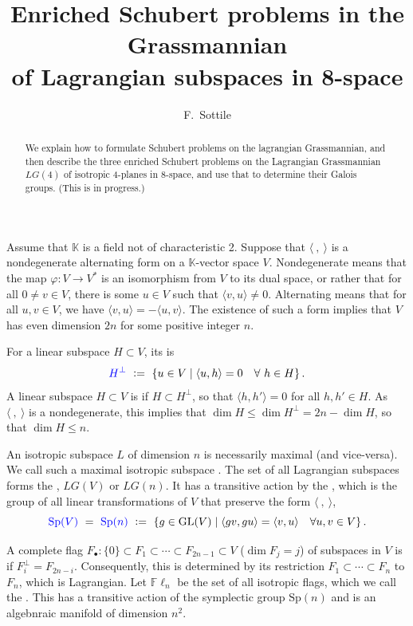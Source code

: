 \documentclass[12pt]{amsart}
\title[Enriched Schubert Problems in $\LG(4)$]{Enriched Schubert problems in the Grassmannian  \\ of Lagrangian subspaces in 8-space}
\author{F.~Sottile}
\theoremstyle{remark}
\newcommand{\GL}{\textrm{GL}}
\newcommand{\Sp}{\textrm{Sp}}
\newcommand{\Fdot}{F_\bullet}
\newcommand{\LG}{\textit{LG}}
\newcommand{\Fln}{{\mathbb F}\ell_n}
\newcommand{\KK}{{\mathbb K}}
\newcommand{\defcolor}[1]{{\color{blue}#1}}
\newcommand{\demph}[1]{\defcolor{{\sl #1}}}
\begin{document}
\begin{abstract}
  We explain how to formulate Schubert problems on the lagrangian Grassmannian, and then
  describe the three enriched Schubert problems on the Lagrangian Grassmannian $\LG(4)$ of isotropic 4-planes in 8-space,
  and use that to determine their Galois groups. (This is in progress.)
\end{abstract}
\maketitle



Assume that $\KK$ is a field not of characteristic 2.
Suppose that $\langle\:,\:\rangle$ is a nondegenerate alternating form on a $\KK$-vector space $V$.
Nondegenerate means that the map $\varphi\colon V\to V^*$ is an isomorphism from $V$ to its dual space,
or rather that for all $0\neq v\in V$, there is some $u\in V$ such that $\langle v, u\rangle\neq 0$.
Alternating means that for all $u,v\in V$, we have $\langle v,u\rangle = - \langle u,v\rangle$.
The existence of such a form implies that $V$ has even dimension $2n$ for some positive integer $n$.

For a linear subspace $H\subset V$, its \demph{annihilator} is
\[
    \defcolor{H^\perp} \ \vcentcolon=\ \{u\in V\mid \langle u, h\rangle =0\quad\forall\ h\in H\}\,.
\]
A linear subspace $H\subset V$ is \demph{isotropic} if $H\subset H^\perp$, so that $\langle h,h'\rangle=0$
for all $h,h'\in H$.
As $\langle\:,\:\rangle$ is a nondegenerate, this implies that $\dim H \leq \dim H^\perp = 2n-\dim H$, so that
$\dim H\leq n$.

An isotropic subspace $L$ of dimension $n$ is necessarily maximal (and vice-versa).
We call such a maximal isotropic subspace \demph{Lagrangian}.
The set of all Lagrangian subspaces forms the \demph{Lagrangian Grassmannian}, \defcolor{$\LG(V)$} or \defcolor{$\LG(n)$}.
It has a transitive action by the \demph{symplectic group}, which is the group of all linear transformations of $V$ that
preserve the form $\langle\:,\:\rangle$,
\[
    \defcolor{\Sp(V)}\ =\ \defcolor{\Sp(n)}\ \vcentcolon=\
    \{ g\in \GL(V) \mid \langle gv, gu\rangle=\langle v, u\rangle\quad \forall u,v\in V\}\,.
\]

A complete flag $\Fdot\colon \{0\}\subset F_1\subset\dotsb\subset F_{2n-1}\subset V$ ($\dim F_j=j$)
of subspaces in $V$ is \demph{isotropic} if $F_i^\perp=F_{2n-i}$.
Consequently, this is determined by its restriction $F_1\subset\dotsb\subset F_n$ to $F_n$, which is Lagrangian.
Let $\Fln$ be the set of all isotropic flags, which we call the \demph{sympletic flag manifold}.
This has a transitive action of the symplectic group $\Sp(n)$ and is an algebnraic manifold of dimension $n^2$.
  
\end{document}
